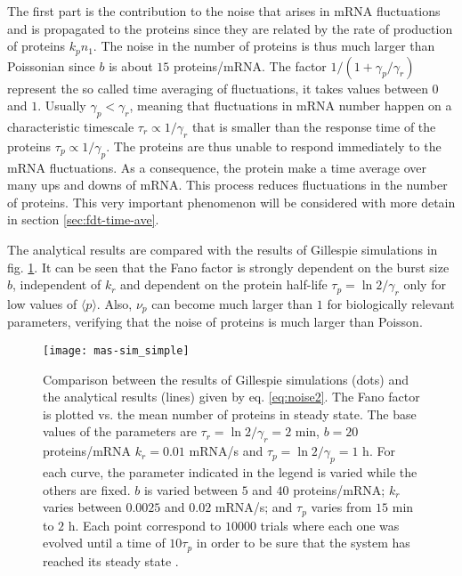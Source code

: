 The first part is the contribution to the noise that arises in mRNA fluctuations and is propagated to the proteins since they are related by the rate of production of proteins $k_pn_1$. The noise in the number of proteins is thus much larger than Poissonian since $b$ is about $15$ proteins/mRNA. The factor $1/(1+\gamma_p/\gamma_r)$ represent the so called time averaging of fluctuations, it takes values between $0$ and $1$. Usually $\gamma_p<\gamma_r$, meaning that fluctuations in mRNA number happen on a characteristic timescale $\tau_r \propto 1/\gamma_r$  that is smaller than the response time of the proteins $\tau_p \propto 1/\gamma_p$. The proteins are thus unable to respond immediately to the mRNA fluctuations. As a consequence, the protein make a time average over many ups and downs of mRNA. This process reduces fluctuations in the number of proteins. This very important phenomenon will be considered with more detain in section \ref{sec:fdt-time-ave}.

The analytical results are compared with the results of Gillespie simulations in fig. \ref{fig:mas-sim_simple}. It can be seen that the Fano factor is strongly dependent on the burst size $b$, independent of $k_r$ and dependent on the protein half-life $\tau_p = \ln2/\gamma_r$ only for low values of $\langle p\rangle$. Also, $\nu_p$ can become much larger than $1$ for biologically relevant parameters, verifying that the noise of proteins is much larger than Poisson.

\begin{figure}[H]
  \centering
  \texttt{[image: mas-sim\_simple]}
  \caption[Noise in proteins: comparing analytical results and Gillespie simulations]{\label{fig:mas-sim_simple} Comparison between the results of Gillespie simulations (dots) and the analytical results (lines) given by eq. \eqref{eq:noise2}. The Fano factor is plotted vs. the mean number of proteins in steady state. The base values of the parameters are $\tau_r = \ln2/\gamma_r = 2$ min,  $b=20$ proteins/mRNA $k_r = 0.01$ mRNA/s and $\tau_p = \ln2/\gamma_p = 1$ h. For each curve, the parameter indicated in the legend is varied while the others are fixed. $b$ is varied between $5$ and $40$ proteins/mRNA; $k_r$ varies between $0.0025$ and $0.02$ mRNA/s; and $\tau_p$ varies from $15$ min to $2$ h. Each point correspond to $10000$ trials where each one was evolved until a time of $10\tau_p$ in order to be sure that the system has reached its steady state \footnotemark.}
\end{figure}

